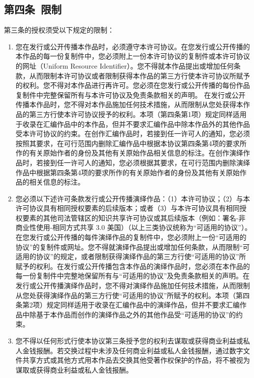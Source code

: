\subsection{第四条\ 限制}
第三条的授权须受以下规定的限制： 
\begin{enumerate}
	\item 您在发行或公开传播本作品时，必须遵守本许可协议。在您发行或公开传播的本作品的每一份复制件中，您必须附上一份本许可协议的复制件或本许可协议的网址（Uniform Resource Identifier）。您不得就本作品提出或增加任何条款，从而限制本许可协议或者限制获得本作品的第三方行使本许可协议所赋予的权利。您不得对本作品进行再许可。您必须在您发行或公开传播的每份作品复制件中完整保留所有与本许可协议及免责条款相关的声明。 在发行或公开传播本作品时，您不得对本作品施加任何技术措施，从而限制从您处获得本作品的第三方行使本许可协议授予的权利。本项（第四条第1项）规定同样适用于收录在汇编作品中的本作品，但并不要求汇编作品中除本作品外的其他作品受本许可协议的约束。在创作汇编作品时，若接到任一许可人的通知，您必须按照其要求，在可行范围内删除汇编作品中根据本协议第四条第4项的要求所作的有关原始作者的身份及其他有关原始作品相关信息的标注。在创作演绎作品时，若接到任一许可人的通知，您必须根据其要求，在可行范围内删除演绎作品中根据第四条第4项的要求所作的有关原始作者的身份及其他有关原始作品的相关信息的标注。
	\item 您必须以下述许可条款发行或公开传播演绎作品：（1）本许可协议；（2）与本许可协议具有相同授权要素的后续版本；或者（3）与本许可协议具有相同授权要素的其他司法管辖区的知识共享许可协议或其后续版本（例如：署名-非商业性使用-相同方式共享 3.0 美国）（以上三类协议统称为“可适用的协议”）。在您发行或公开传播的每件演绎作品的复制件中，您必须附上一份“可适用的协议”的复制件或网址。您不得就演绎作品提出或增加任何条款，从而限制“可适用的协议”的规定，或者限制获得演绎作品的第三方行使“可适用的协议”所赋予的权利。在发行或公开传播包含本作品的演绎作品时，您必须在本作品的每一份复制件中完整地保留所有与“可适用的协议”及免责条款相关的声明。在发行或公开传播演绎作品时，您不得对演绎作品施加任何技术措施，从而限制从您处获得演绎作品的第三方行使“可适用的协议”所赋予的权利。本项（第四条第2项）规定同样适用于收录在汇编作品中的演绎作品，但并不要求汇编作品中除基于本作品而创作的演绎作品之外的其他作品受“可适用的协议”的约束。 
	\item 您不得以任何形式行使本协议第三条授予您的权利去谋取或获得商业利益或私人金钱报酬。若交换过程中未涉及任何商业利益或私人金钱报酬，通过数字文件共享方式或其他方式用本作品去交换其他受著作权保护的作品，将不被视为谋取或获得商业利益或私人金钱报酬。

\end{enumerate}
